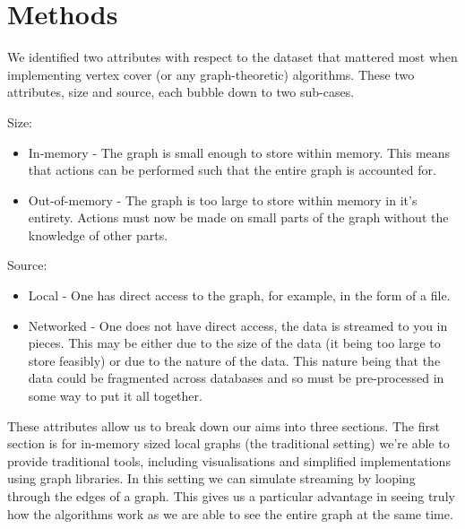 \section{Methods}

We identified two attributes with respect to the dataset that mattered most
when implementing vertex cover (or any graph-theoretic) algorithms. These two
attributes, size and source, each bubble down to two sub-cases.

Size:

\begin{itemize}
    \item
          In-memory - The graph is small enough to store within memory. This
          means that actions can be performed such that the entire graph is
          accounted for.
    \item
          Out-of-memory - The graph is too large to store within memory in it's
          entirety. Actions must now be made on small parts of the graph
          without the knowledge of other parts.
\end{itemize}

Source:

\begin{itemize}
    \item
          Local - One has direct access to the graph, for example, in the form
          of a file.
    \item
          Networked - One does not have direct access, the data is streamed to
          you in pieces. This may be either due to the size of the data (it
          being too large to store feasibly) or due to the nature of the data.
          This nature being that the data could be fragmented across databases
          and so must be pre-processed in some way to put it all together.
\end{itemize}

These attributes allow us to break down our aims into three sections. The first
section is for in-memory sized local graphs (the traditional setting) we're
able to provide traditional tools, including visualisations and simplified
implementations using graph libraries. In this setting we can simulate
streaming by looping through the edges of a graph. This gives us a particular
advantage in seeing truly how the algorithms work as we are able to see the
entire graph at the same time.

